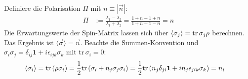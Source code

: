 \documentclass[a4paper,12pt]{article}
\newcommand{\bra}{}
\newcommand{\tecxt}{}
\begin{document}
Definiere die Polarisation $\Pi$ mit $n\equiv |\vec{n}|$:
\begin{align*}
\Pi&:=\frac{\lambda_1-\lambda_2}{\lambda_1+\lambda_2}=\frac{1+ n-1+n}{1+n+1-n}=n
\end{align*}
Die Erwartungswerte der Spin-Matrix lassen sich über $\bra\langle {\sigma_j}\rangle=\tecxt\text{tr\,}\sigma_j\rho$ berechnen. Das Ergebnis ist $\bra\langle {\vec{\sigma}}\rangle=\vec{n}$. Beachte die Summen-Konvention und $\sigma_i\sigma_j=\delta_{ij}\mathbf{1}+i\epsilon_{ijk}\sigma_k$ mit tr\,$\sigma_i=0$:
\begin{align*}
\bra\langle {\sigma_i}\rangle&=\tecxt\text{tr\,}(\rho\sigma_i)=\frac{1}{2}\tecxt\text{tr\,}(\sigma_i+n_j\sigma_j\sigma_i)=\frac{1}{2}\tecxt\text{tr\,}(n_j\delta_{ji}\mathbf{1}+ i n_j\epsilon_{jik}\sigma_k)=n_i
\end{align*}
\end{document}
